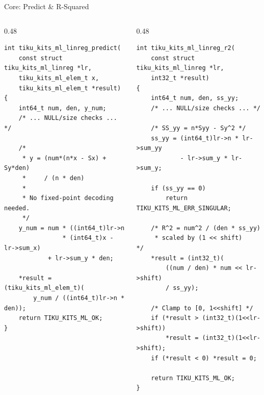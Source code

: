 \documentclass[aspectratio=169, 10pt]{beamer}
\begin{document}
\begin{frame}[fragile]{Core: Predict \& R-Squared}
\begin{columns}[T]
\begin{column}{0.48\textwidth}
\begin{lstlisting}[style=cstyle,
  title={predict --- returns original scale}]
int tiku_kits_ml_linreg_predict(
    const struct tiku_kits_ml_linreg *lr,
    tiku_kits_ml_elem_t x,
    tiku_kits_ml_elem_t *result)
{
    int64_t num, den, y_num;
    /* ... NULL/size checks ... */

    /*
     * y = (num*(n*x - Sx) + Sy*den)
     *     / (n * den)
     *
     * No fixed-point decoding needed.
     */
    y_num = num * ((int64_t)lr->n
                * (int64_t)x - lr->sum_x)
            + lr->sum_y * den;

    *result = (tiku_kits_ml_elem_t)(
        y_num / ((int64_t)lr->n * den));
    return TIKU_KITS_ML_OK;
}
\end{lstlisting}
\end{column}

\begin{column}{0.48\textwidth}
\begin{lstlisting}[style=cstyle,
  title={R-squared --- goodness of fit}]
int tiku_kits_ml_linreg_r2(
    const struct tiku_kits_ml_linreg *lr,
    int32_t *result)
{
    int64_t num, den, ss_yy;
    /* ... NULL/size checks ... */

    /* SS_yy = n*Syy - Sy^2 */
    ss_yy = (int64_t)lr->n * lr->sum_yy
            - lr->sum_y * lr->sum_y;

    if (ss_yy == 0)
        return TIKU_KITS_ML_ERR_SINGULAR;

    /* R^2 = num^2 / (den * ss_yy)
     * scaled by (1 << shift)       */
    *result = (int32_t)(
        ((num / den) * num << lr->shift)
        / ss_yy);

    /* Clamp to [0, 1<<shift] */
    if (*result > (int32_t)(1<<lr->shift))
        *result = (int32_t)(1<<lr->shift);
    if (*result < 0) *result = 0;

    return TIKU_KITS_ML_OK;
}
\end{lstlisting}
\end{column}
\end{columns}
\end{frame}
\end{document}
